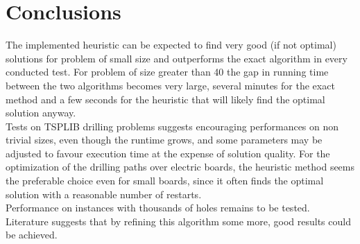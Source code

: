 \section{Conclusions}
\label{sec:conclusion}
The implemented heuristic can be expected to find very good (if not optimal) solutions for problem of small size and outperforms the exact algorithm in every conducted test. For problem of size greater than 40 the gap in running time between the two algorithms becomes very large, several minutes for the exact method and a few seconds for the heuristic that will likely find the optimal solution anyway.\\
Tests on TSPLIB drilling problems suggests encouraging performances on non trivial sizes, even though the runtime grows, and some parameters may be adjusted to favour execution time at the expense of solution quality.
For the optimization of the drilling paths over electric boards, the heuristic method seems the preferable choice even for small boards, since it often finds the optimal solution with a reasonable number of restarts. \\
Performance on instances with thousands of holes remains to be tested. Literature suggests that by refining this algorithm some more, good results could be achieved.
    
